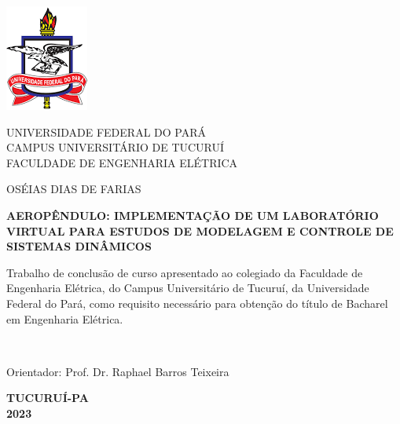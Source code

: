 	\newpage
	\thispagestyle{empty}
		\newpage
		\setcounter{page}{2}
		\newpage
		\thispagestyle{empty}
		\begin{center}
  
            \includegraphics[scale=0.6]{Figuras/logoufpa.png}
            
			UNIVERSIDADE FEDERAL DO PARÁ\\
			CAMPUS UNIVERSITÁRIO DE TUCURUÍ\\
			FACULDADE DE ENGENHARIA ELÉTRICA
			
			\vspace{7mm}
			
			
			OSÉIAS DIAS DE FARIAS
			
			\vfill
			
			\textbf{AEROPÊNDULO: IMPLEMENTAÇÃO DE UM LABORATÓRIO VIRTUAL PARA ESTUDOS DE MODELAGEM E CONTROLE DE SISTEMAS DINÂMICOS}
						
			\vfill
			
			\begin{flushright}				
				{\setlength{\fboxsep}{0pt}}
				
				\begin{minipage}{8.3cm}\footnotesize
						Trabalho de conclusão de curso apresentado ao colegiado da Faculdade de Engenharia Elétrica, do Campus Universitário de Tucuruí, da Universidade Federal do Pará, como  requisito necessário para obtenção do título de Bacharel em Engenharia Elétrica.
				\end{minipage}\\
				\vspace{0pt}
				\begin{flushleft}
				\hspace{9.3cm}	{\footnotesize Orientador: Prof. Dr. Raphael Barros Teixeira} \\
				\end{flushleft}
			\end{flushright}
			\vfill\vfill
			\textbf{TUCURUÍ-PA}\\			
			\textbf{2023}
		\end{center}